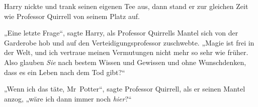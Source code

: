 Harry nickte und trank seinen eigenen Tee aus, dann stand er zur gleichen Zeit wie Professor Quirrell von seinem Platz auf.

„Eine letzte Frage“, sagte Harry, als Professor Quirrells Mantel sich von der Garderobe hob und auf den Verteidigungsprofessor zuschwebte.
„Magie ist frei in der Welt, und ich vertraue meinen Vermutungen nicht mehr so sehr wie früher. Also glauben \emph{Sie} nach bestem Wissen und Gewissen und ohne Wunschdenken, dass es ein Leben nach dem Tod gibt?“

„Wenn ich das täte, Mr~Potter“, sagte Professor Quirrell, als er seinen Mantel anzog, „wäre ich dann immer noch \emph{hier}?“